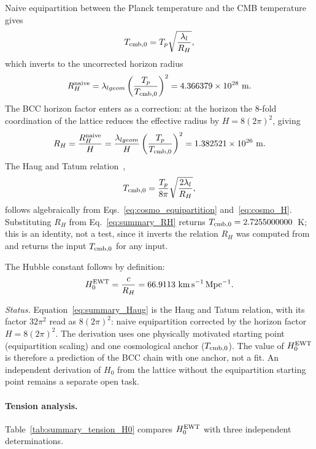 \documentclass[10pt,a4paper]{article}
\begin{document}
Naive equipartition between the Planck temperature and the CMB
temperature gives
\begin{equation}
	T_{\rm cmb,0}
	= T_p \sqrt{\frac{\lambda_l}{R_H}},
	\label{eq:cosmo_equipartition}
\end{equation}
which inverts to the uncorrected horizon radius
\begin{equation}
	R_H^{\rm naive}
	= \lambda_{l geom} \left(\frac{T_p}{T_{\rm cmb,0}}\right)^2
	= 4.366379\times 10^{28}\ {\rm m}.
	\label{eq:cosmo_RH_naive}
\end{equation}
The BCC horizon factor enters as a correction: at the horizon the
8-fold coordination of the lattice reduces the effective radius by
\(H = 8(2\pi)^2\), giving
\begin{equation}
	R_H
	= \frac{R_H^{\rm naive}}{H}
	= \frac{\lambda_{l geom}}{H}
	\left(\frac{T_p}{T_{\rm cmb,0}}\right)^2
	= 1.382521\times 10^{26}\ {\rm m}.
	\label{eq:summary_RH}
\end{equation}
The Haug and Tatum
relation~\cite{Haug2026Astronomy,HaugTatum2024},
\begin{equation}
	T_{\rm cmb,0}
	= \frac{T_p}{8\pi}\sqrt{\frac{2\lambda_l}{R_H}},
	\label{eq:summary_Haug}
\end{equation}
follows algebraically from
Eqs.~\eqref{eq:cosmo_equipartition} and~\eqref{eq:cosmo_H}.
Substituting \(R_H\) from Eq.~\eqref{eq:summary_RH} returns
\(T_{\rm cmb,0} = 2.7255000000\)~K; this is an identity, not a test,
since it inverts the relation \(R_H\) was computed from and returns
the input \(T_{\rm cmb,0}\) for any input.

The Hubble constant follows by definition:
\begin{equation}
	H_0^{\rm EWT} = \frac{c}{R_H}
	= 66.9113\ {\rm km\,s^{-1}\,Mpc^{-1}}.
	\label{eq:summary_H0}
\end{equation}

\emph{Status.} Equation~\eqref{eq:summary_Haug} is the Haug and
Tatum relation, with its factor $32\pi^2$ read as $8(2\pi)^2$: naive
equipartition corrected by the horizon factor \(H = 8(2\pi)^2\). The
derivation uses one physically motivated
starting point (equipartition scaling) and one cosmological anchor
(\(T_{\rm cmb,0}\)). The value of \(H_0^{\rm EWT}\) is therefore a
prediction of the BCC chain with one anchor, not a fit. An
independent derivation of \(H_0\) from the lattice without the
equipartition starting point remains a separate open task.

\paragraph{Tension analysis.} Table~\ref{tab:summary_tension_H0}
compares \(H_0^{\rm EWT}\) with three independent determinations.
\end{document}
